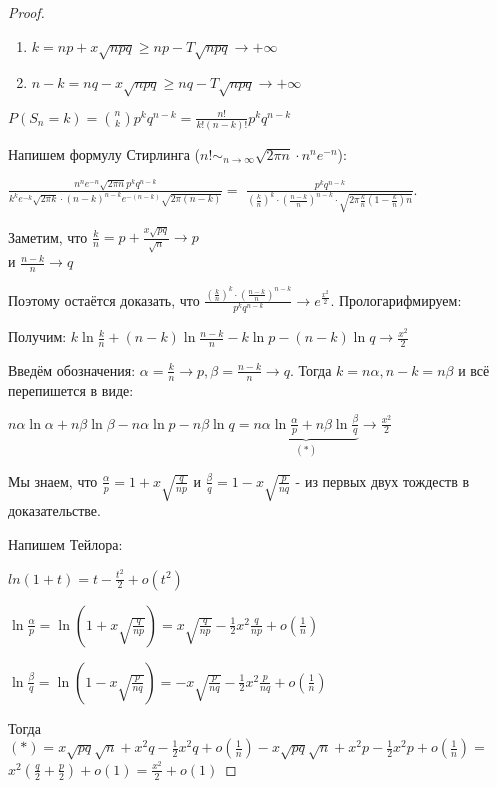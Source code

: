 \begin{proof}
    \hfill \smallbreak
    \begin{enumerate}
        \item {
            $k = np + x\sqrt{npq} \geqslant np - T\sqrt{npq} \rightarrow +\infty$
        }
        \item {
            $n - k = nq - x\sqrt{npq} \geqslant nq - T\sqrt{npq} \rightarrow +\infty$
        }
    \end{enumerate}

    $P(S_n = k) = \binom{n}{k} p^k q^{n - k} = \frac{n!}{k!(n - k)!}p^k q^{n - k}$

    Напишем формулу Стирлинга ($n! \sim_{n \to \infty} \sqrt{2 \pi n} \cdot n^n e^{-n}$):

    $\frac{n^n e^{-n} \sqrt{2\pi n}p^kq^{n-k}}{k^k e^{-k} \sqrt{2\pi k} \cdot (n - k)^{n - k} e^{-(n - k)} \sqrt{2 \pi (n - k)}} =$
    $\frac{p^k q^{n - k}}{(\frac{k}{n})^k \cdot (\frac{n - k}{n})^{n - k} \cdot \sqrt{2 \pi \frac{k}{n} (1 - \frac{k}{n})n}}$.


    Заметим, что $\frac{k}{n} = p + \frac{x\sqrt{pq}}{\sqrt{n}} \rightarrow p$ \\ и $\frac{n - k}{n} \rightarrow q$

    Поэтому остаётся доказать, что $\frac{(\frac{k}{n})^k \cdot (\frac{n - k}{n})^{n - k}}{p^k q^{n - k}} \rightarrow e^{\frac{x^2}{2}}$. Прологарифмируем:

    Получим: $k \ln \frac{k}{n} + (n - k) \ln \frac{n - k}{n} - k \ln p - (n - k)\ln q \rightarrow \frac{x^2}{2}$

    Введём обозначения: $\alpha = \frac{k}{n} \rightarrow p, \beta = \frac{n - k}{n} \rightarrow q$. Тогда $k = n\alpha, n - k = n\beta$ и всё перепишется в виде:

    $n \alpha \ln \alpha + n \beta \ln \beta - n\alpha \ln p - n\beta \ln q = \underbrace{n\alpha \ln \frac{\alpha}{p} + n \beta \ln \frac{\beta}{q}}_{(*)} \rightarrow \frac{x^2}{2}$

    Мы знаем, что $\frac{\alpha}{p} = 1 + x\sqrt{\frac{q}{np}}$ и $\frac{\beta}{q} = 1 - x\sqrt{\frac{p}{nq}}$ - из первых двух тождеств в доказательстве.

    Напишем Тейлора:

    $ln(1+t) = t - \frac{t^2}{2} + o(t^2)$

    $\ln \frac{\alpha}{p} = \ln (1 + x\sqrt{\frac{q}{np}}) = x\sqrt{\frac{q}{np}} - \frac{1}{2}x^2\frac{q}{np} + o(\frac{1}{n}) $

    $\ln \frac{\beta}{q} = \ln (1 - x\sqrt{\frac{p}{nq}}) = -x\sqrt{\frac{p}{nq}} - \frac{1}{2}x^2 \frac{p}{nq} + o(\frac{1}{n})$

    Тогда $(*) = x\sqrt{pq}\sqrt{n} + x^2q - \frac{1}{2}x^2q + o(\frac{1}{n}) - x\sqrt{pq}\sqrt{n} + x^2p - \frac{1}{2}x^2p + o(\frac{1}{n}) = $
    $x^2 (\frac{q}{2} + \frac{p}{2}) + o(1) = \frac{x^2}{2} + o(1)$
\end{proof}

